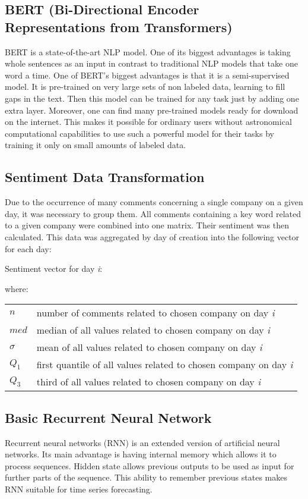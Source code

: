 \documentclass[11pt]{article} %
\makeatletter
\newenvironment{conditions}
  {\par\vspace{\abovedisplayskip}\noindent\begin{tabular}{>{$}l<{$} @{${}={}$} l}}
  {\end{tabular}\par\vspace{\belowdisplayskip}}
\makeatother
\begin{document}
\subsection{BERT (Bi-Directional Encoder Representations from Transformers)}
BERT is a state-of-the-art NLP model. One of its biggest advantages is taking whole sentences as an input in contrast to traditional NLP models that take one word a time. One of BERT's biggest advantages is that it is a semi-supervised model. It is pre-trained on very large sets of non labeled data, learning to fill gaps in the text. Then this model can be trained for any task just by adding one extra layer. Moreover, one can find many pre-trained models ready for download on the internet. This makes it possible for ordinary users without astronomical computational capabilities to use such a powerful model for their tasks by training it only on small amounts of labeled data. 

\subsection{Sentiment Data Transformation}
Due to the occurrence of many comments concerning a single company on a given day, it was necessary to group them. All comments containing a key word related to a given company were combined into one matrix. Their sentiment was then calculated. This data was aggregated by day of creation into the following vector for each day: 
\begin{center}   Sentiment vector for day \emph{i}:\end{center}
\begin{equation} [n, \mu, \sigma, med, Q_1, Q_3] \end{equation}
where:
\begin{conditions}
 n     &  number of comments related to chosen company on day \emph{i}\\
 med     &  median of all values related to chosen company on day \emph{i} \\   
\sigma    &  mean of all values related to chosen company on day \emph{i} \\   
Q_1     &  first quantile of all values related to chosen company on day \emph{i} \\   
Q_3     &  third of all values related to chosen company on day \emph{i} \\   
\end{conditions}

\subsection{Basic Recurrent Neural Network}
Recurrent neural networks (RNN) is an extended version of artificial neural networks. Its main advantage is having internal memory which allows it to process sequences. Hidden state allows previous outputs to be used as input for further parts of the sequence. This ability to remember previous states makes RNN suitable for time series forecasting. 
\end{document}
